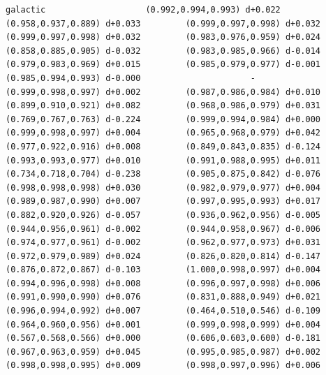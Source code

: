 \documentclass[11pt, letterpaper, openany]{book}
\begin{document}
\begin{empiricalbox}
\begin{lstlisting}[style=terminal]
galactic                    (0.992,0.994,0.993) d+0.022         (0.958,0.937,0.889) d+0.033         (0.999,0.997,0.998) d+0.032         (0.999,0.997,0.998) d+0.032         (0.983,0.976,0.959) d+0.024         (0.858,0.885,0.905) d-0.032         (0.983,0.985,0.966) d-0.014         (0.979,0.983,0.969) d+0.015         (0.985,0.979,0.977) d-0.001         (0.985,0.994,0.993) d-0.000                      -                      (0.999,0.998,0.997) d+0.002         (0.987,0.986,0.984) d+0.010         (0.899,0.910,0.921) d+0.082         (0.968,0.986,0.979) d+0.031         (0.769,0.767,0.763) d-0.224         (0.999,0.994,0.984) d+0.000         (0.999,0.998,0.997) d+0.004         (0.965,0.968,0.979) d+0.042         (0.977,0.922,0.916) d+0.008         (0.849,0.843,0.835) d-0.124         (0.993,0.993,0.977) d+0.010         (0.991,0.988,0.995) d+0.011         (0.734,0.718,0.704) d-0.238         (0.905,0.875,0.842) d-0.076         (0.998,0.998,0.998) d+0.030         (0.982,0.979,0.977) d+0.004         (0.989,0.987,0.990) d+0.007         (0.997,0.995,0.993) d+0.017         (0.882,0.920,0.926) d-0.057         (0.936,0.962,0.956) d-0.005         (0.944,0.956,0.961) d-0.002         (0.944,0.958,0.967) d-0.006         (0.974,0.977,0.961) d-0.002         (0.962,0.977,0.973) d+0.031         (0.972,0.979,0.989) d+0.024         (0.826,0.820,0.814) d-0.147         (0.876,0.872,0.867) d-0.103         (1.000,0.998,0.997) d+0.004         (0.994,0.996,0.998) d+0.008         (0.996,0.997,0.998) d+0.006         (0.991,0.990,0.990) d+0.076         (0.831,0.888,0.949) d+0.021         (0.996,0.994,0.992) d+0.007         (0.464,0.510,0.546) d-0.109         (0.964,0.960,0.956) d+0.001         (0.999,0.998,0.999) d+0.004         (0.567,0.568,0.566) d+0.000         (0.606,0.603,0.600) d-0.181         (0.967,0.963,0.959) d+0.045         (0.995,0.985,0.987) d+0.002         (0.998,0.998,0.995) d+0.009         (0.998,0.997,0.996) d+0.006     

\end{lstlisting}
\end{empiricalbox}
\end{document}
